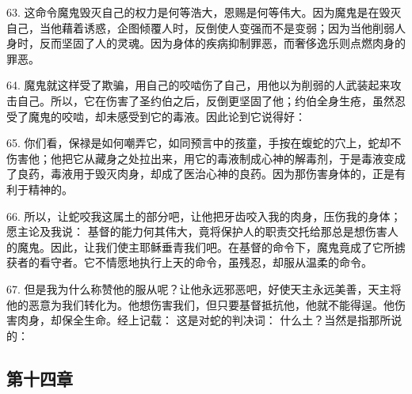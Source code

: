 63. 这命令魔鬼毁灭自己的权力是何等浩大，恩赐是何等伟大。因为魔鬼是在毁灭自己，当他藉着诱惑，企图倾覆人时，反倒使人变强而不是变弱；因为当他削弱人身时，反而坚固了人的灵魂。因为身体的疾病抑制罪恶，而奢侈逸乐则点燃肉身的罪恶。\par

64. 魔鬼就这样受了欺骗，用自己的咬啮伤了自己，用他以为削弱的人武装起来攻击自己。所以，它在伤害了圣约伯之后，反倒更坚固了他；约伯全身生疮，虽然忍受了魔鬼的咬啮，却未感受到它的毒液。因此论到它说得好：\par

65. 你们看，保禄是如何嘲弄它，如同预言中的孩童，手按在蝮蛇的穴上，蛇却不伤害他；他把它从藏身之处拉出来，用它的毒液制成心神的解毒剂，于是毒液变成了良药，毒液用于毁灭肉身，却成了医治心神的良药。因为那伤害身体的，正是有利于精神的。\par

66. 所以，让蛇咬我这属土的部分吧，让他把牙齿咬入我的肉身，压伤我的身体；愿主论及我说： 基督的能力何其伟大，竟将保护人的职责交托给那总是想伤害人的魔鬼。因此，让我们使主耶稣垂青我们吧。在基督的命令下，魔鬼竟成了它所掳获者的看守者。它不情愿地执行上天的命令，虽残忍，却服从温柔的命令。\par

67. 但是我为什么称赞他的服从呢？让他永远邪恶吧，好使天主永远美善，天主将他的恶意为我们转化为。他想伤害我们，但只要基督抵抗他，他就不能得逞。他伤害肉身，却保全生命。经上记载： 这是对蛇的判决词：  什么土？当然是指那所说的： \par


\subsection{第十四章}

\par

